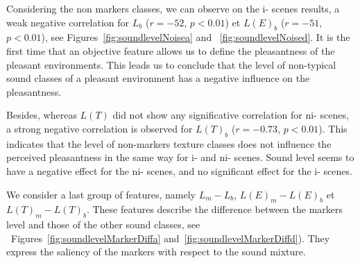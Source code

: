 \documentclass[twoside,twocolumn]{article}
\begin{document}
Considering the non markers classes, we can observe on the i- scenes results, a weak negative correlation for $L_b$  ($r=-52$, $p<0.01$) et $L(E)_b$ ($r=-51$, $p<0.01$), see Figures~\ref{fig:soundlevelNoisea}  and ~\ref{fig:soundlevelNoised}. It is the first time that an objective feature allows us to define the pleasantness of the pleasant environments. This leads us to conclude that the level of non-typical sound classes of a pleasant environment has a negative influence on the pleasantness.


Besides, whereas $L(T)$ did not show any significative correlation for ni- scenes, a strong negative correlation is observed for $L(T)_b$ ($r = -0.73$, $p < 0.01$). This indicates that the level of non-markers texture classes does not influence the perceived pleasantness in the same way for i- and ni- scenes. Sound level seems to have a negative effect for the ni- scenes, and no significant effect for the i- scenes.


We consider a last group of features, namely $L_m-L_b$, $L(E)_m-L(E)_b$ et $L(T)_m-L(T)_b$.  These features describe the difference between the markers level and those of the other sound classes, see ~Figures~\ref{fig:soundlevelMarkerDiffa} and~\ref{fig:soundlevelMarkerDiffd}). They express the saliency of the markers with respect to the sound mixture.

\end{document}
